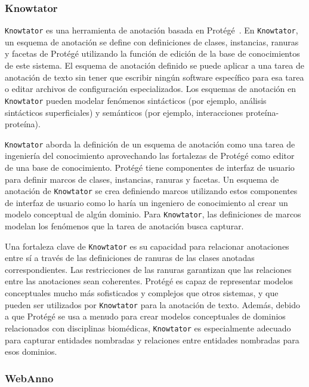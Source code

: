 \subsubsection*{Knowtator}

\texttt{Knowtator} es una herramienta de anotación basada en Protégé~\cite{musen2015protege}.
En \texttt{Knowtator}, un esquema de anotación se define con definiciones de clases, instancias, ranuras y facetas de Protégé utilizando la función de edición de la base de conocimientos de este sistema.
El esquema de anotación definido se puede aplicar a una tarea de anotación de texto sin tener que escribir ningún software específico para esa tarea o editar archivos de configuración especializados.
Los esquemas de anotación en \texttt{Knowtator} pueden modelar fenómenos sintácticos (por ejemplo, análisis sintácticos superficiales) y semánticos (por ejemplo, interacciones proteína-proteína).

\texttt{Knowtator} aborda la definición de un esquema de anotación como una tarea de ingeniería del conocimiento aprovechando las fortalezas de Protégé como editor de una base de conocimiento.
Protégé tiene componentes de interfaz de usuario para definir marcos de clases, instancias, ranuras y facetas.
Un esquema de anotación de \texttt{Knowtator} se crea definiendo marcos utilizando estos componentes de interfaz de usuario como lo haría un ingeniero de conocimiento al crear un modelo conceptual de algún dominio.
Para \texttt{Knowtator}, las definiciones de marcos modelan los fenómenos que la tarea de anotación busca capturar.

Una fortaleza clave de \texttt{Knowtator} es su capacidad para relacionar anotaciones entre sí a través de las definiciones de ranuras de las clases anotadas correspondientes.
Las restricciones de las ranuras garantizan que las relaciones entre las anotaciones sean coherentes.
Protégé es capaz de representar modelos conceptuales mucho más sofisticados y complejos que otros sistemas, y que pueden ser utilizados por \texttt{Knowtator} para la anotación de texto.
Además, debido a que Protégé se usa a menudo para crear modelos conceptuales de dominios relacionados con disciplinas biomédicas, \texttt{Knowtator} es especialmente adecuado para capturar entidades nombradas y relaciones entre entidades nombradas para esos dominios.

\subsubsection*{WebAnno}

